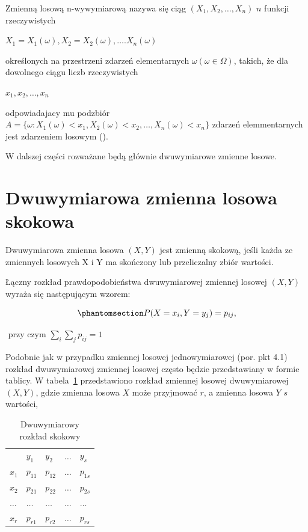 \documentclass[
  letterpaper,
  DIV=11,
  numbers=noendperiod]{scrreprt}
\begin{document}
Zmienną losową n-wywymiarową nazywa się ciąg \((X_1, X_2, \ldots, X_n)\)
\(n\) funkcji rzeczywistych

\(X_1=X_1(\omega), X_2=X_2(\omega), \ldots. X_n(\omega)\)

określonych na przestrzeni zdarzeń elementarnych
\(\omega (\omega \in \Omega)\), takich, że dla dowolnego ciągu liczb
rzeczywistych

\(x_1, x_2, \ldots, x_n\)

odpowiadajacy mu podzbiór
\(A=\{ \omega: X_1(\omega) < x_1,X_2(\omega)  <x_2,\ldots, X_n(\omega)  <x_n \}\)
zdarzeń elemmentarnych jest zdarzeniem losowym
().

W dalszej części rozważane będą głównie dwuwymiarowe zmienne losowe.

\section{Dwuwymiarowa zmienna losowa
skokowa}\label{dwuwymiarowa-zmienna-losowa-skokowa}

Dwuwymiarowa zmienna losowa \((X, Y)\) jest zmienną skokową, jeśli każda
ze zmiennych losowych X i Y ma skończony lub przeliczalny zbiór
wartości.

Łączny rozkład prawdopodobieństwa dwuwymiarowej zmiennej losowej
\((X, Y)\) wyraża się następującym wzorem:

\begin{equation}\phantomsection\label{eq-roz_p2wym}{P(X=x_i, Y=y_j) =  p_{ij},}\end{equation}

\(\text{ przy czym } \sum_i\sum_jp_{ij}=1\)

Podobnie jak w przypadku zmiennej losowej jednowymiarowej (por. pkt 4.1)
rozkład dwuwymiarowej zmiennej losowej często będzie przedstawiany w
formie tablicy. W tabela~\ref{tbl-2wym} przedstawiono rozkład zmiennej
losowej dwuwymiarowej \((X,Y)\), gdzie zmienna losowa \(X\) może
przyjmować \(r\), a zmienna losowa \(Y\) \(s\) wartości,

\begin{longtable}[]{@{}lllll@{}}
\caption{Dwuwymiarowy rozkład skokowy}\label{tbl-2wym}\tabularnewline
\toprule\noalign{}
\endfirsthead
\endhead
\bottomrule\noalign{}
\endlastfoot
& \(y_1\) & \(y_2\) & \(\ldots\) & \(y_s\) \\
\(x_1\) & \(p_{11}\) & \(p_{12}\) & \(\ldots\) & \(p_{1s}\) \\
\(x_2\) & \(p_{21}\) & \(p_{22}\) & \(\ldots\) & \(p_{2s}\) \\
\(\ldots\) & \(\ldots\) & \(\ldots\) & \(\ldots\) & \(\ldots\) \\
\(x_r\) & \(p_{r1}\) & \(p_{r2}\) & \(\ldots\) & \(p_{rs}\) \\
\end{longtable}
\end{document}
